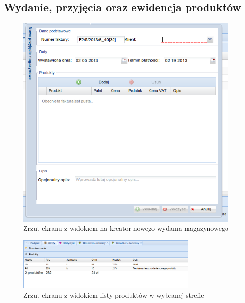 	\subsection{Wydanie, przyjęcia oraz ewidencja produktów}
		\begin{figure}[H]
			\centering
			\includegraphics[width=0.99\textwidth]{images/app/new_supply_preview}
			\caption[Aplikacja - Dodanie nowego dokumentu wydania]{Zrzut ekranu z widokiem na kreator nowego wydania magazynowego}
			\label{c7:fig:app:new_supply_preview}
		\end{figure}
		\begin{figure}[H]
			\centering
			\includegraphics[width=0.8\textwidth]{images/app/unit_products_preview}
			\caption[Aplikacja - Ewidencja towarów w poszczególnych strefach]{Zrzut ekranu z widokiem listy produktów w wybranej strefie}
			\label{c7:fig:app:unit_products_preview}
		\end{figure}